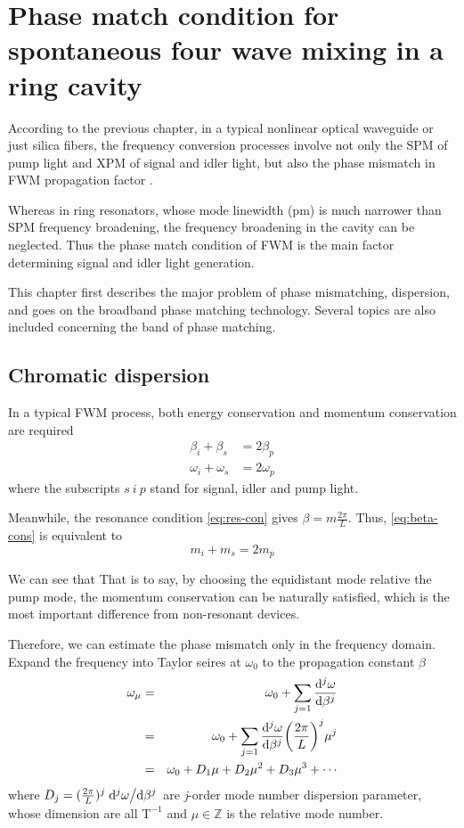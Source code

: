 \chapter{Phase match condition for spontaneous four wave mixing in a ring cavity }\label{chap:pmc-sfwm}
According to the previous chapter, in a typical nonlinear optical waveguide or just silica fibers, the frequency conversion processes involve not only the SPM of pump light and XPM of signal and idler light, but also the phase mismatch in FWM propagation factor \cite{Agrawal2013a}. 

Whereas in ring resonators, 
whose mode linewidth (pm) is much narrower than SPM frequency broadening, the frequency broadening in the cavity can be neglected. Thus the phase match condition of FWM is the main factor determining signal and idler light generation. 

This chapter first describes the major problem of phase mismatching, dispersion, and goes on the broadband phase matching technology. Several topics are also included concerning the band of phase matching.

\section{Chromatic dispersion}

In a typical FWM process, both energy conservation and momentum conservation are required 
\begin{align}
  \beta_i + \beta_s & = 2 \beta_p \label{eq:beta-cons} \\
  \omega_i + \omega_s & = 2 \omega_p \label{eq:omega-cons}
\end{align}
where the subscripts $s~i~p$ stand for signal, idler and pump light.

Meanwhile, the resonance condition \autoref{eq:res-con} gives $\beta = m \frac{2 \pi}{L}$. Thus, \autoref{eq:beta-cons} is equivalent to 
\begin{equation}\label{eq:mu-cons}
  m_i + m_s = 2 m_p 
\end{equation} 
  
We can see that  That is to say, by choosing the equidistant mode relative the pump mode, the momentum conservation can be naturally satisfied, which is the most important difference from non-resonant devices.

Therefore, we can estimate the phase mismatch only in the frequency domain. Expand the frequency into Taylor seires at $\omega_0$ to the propagation constant $\beta$
\begin{eqnarray}
  \omega_{\mu} & = & \omega_0 
  + \sum_{j=1}\dv[j]{\omega}{\beta} (\beta_{\mu}-\beta_0) \\
  & = & \omega_0 
  + \sum_{j=1}\dv[j]{\omega}{\beta} \qty(\frac{2 \pi}{L})^j \mu^j \nonumber \\
  & = & \omega_0 + D_1 \mu + D_2 \mu^2 + D_3 \mu^3 + \cdots \nonumber
\end{eqnarray}
where $D_j =  (\frac{2 \pi}{L})^j\dv*[j]{\omega}{\beta}$ are \textit{j}-order mode number dispersion parameter, whose dimension are all $\mathrm{T}^{-1}$ and $\mu \in \mathbb{Z}$ is the relative mode number. 

